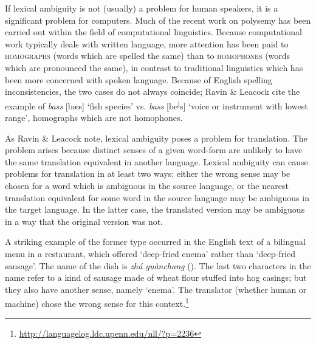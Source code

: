 If lexical ambiguity is not (usually) a problem for human speakers, it is a significant problem for computers. Much of the recent work on polysemy has been carried out within the field of computational linguistics. Because computational work typically deals with written language, more attention has been paid to \textsc{homographs} (words which are spelled the same) than to \textsc{homophones} (words which are pronounced the same), in contrast to traditional linguistics which has been more concerned with spoken language. Because of English spelling inconsistencies, the two cases do not always coincide; Ravin \& Leacock cite the example of \textit{bass} [bæs] ‘fish species’ vs. \textit{bass} [be\textsuperscript{j}s] ‘voice or instrument with lowest range’, homographs which are not homophones.



As Ravin \& Leacock note, lexical ambiguity poses a problem for translation. The problem arises because distinct senses of a given word-form are unlikely to have the same translation equivalent in another language. Lexical ambiguity can cause problems for translation in at least two ways: either the wrong sense may be chosen for a word which is ambiguous in the source language, or the nearest translation equivalent for some word in the source language may be ambiguous in the target language. In the latter case, the translated version may be ambiguous in a way that the original version was not.



A striking example of the former type occurred in the English text of a bilingual menu in a  restaurant, which offered ‘deep-fried enema’ rather than ‘deep-fried sausage’. The  name of the dish is \textit{zhá guànchang} (). The last two characters in the name refer to a kind of sausage made of wheat flour stuffed into hog casings; but they also have another sense, namely ‘enema’. The translator (whether human or machine) chose the wrong sense for this context.\footnote{\url{http://languagelog.ldc.upenn.edu/nll/?p=2236}} 




